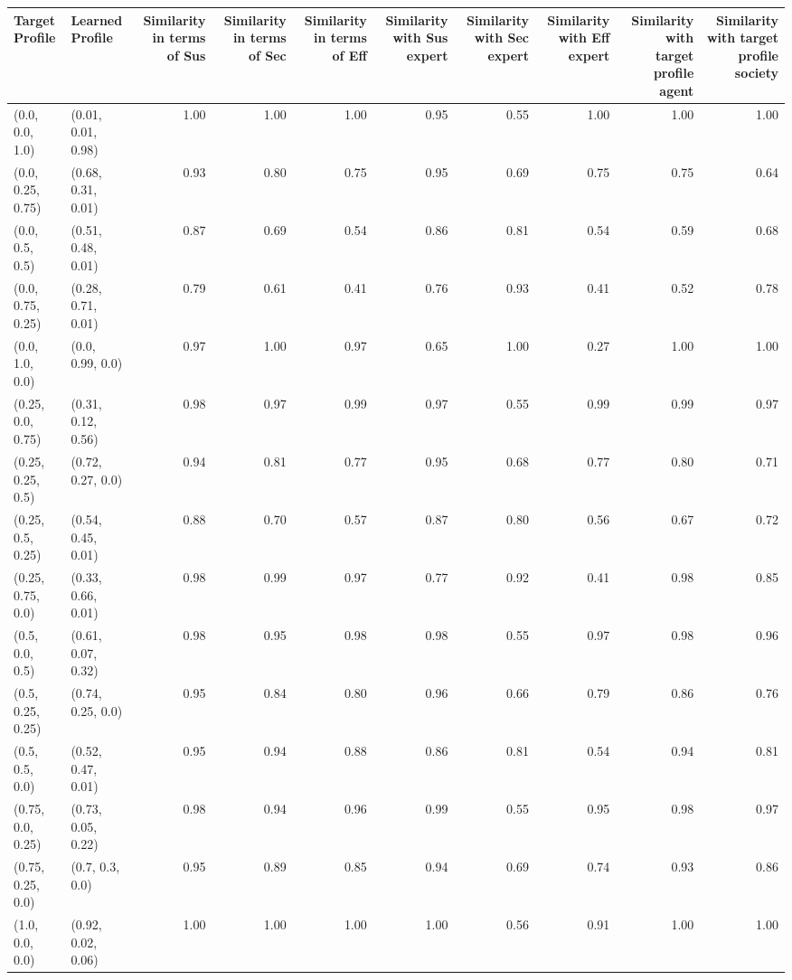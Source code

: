 \begin{tabular}{llrrrrrrrr}
\toprule
Target Profile & Learned Profile & Similarity in terms of Sus & Similarity in terms of Sec & Similarity in terms of Eff & Similarity with Sus expert & Similarity with Sec expert & Similarity with Eff expert & Similarity with target profile agent & Similarity with target profile society \\
\midrule
(0.0, 0.0, 1.0) & (0.01, 0.01, 0.98) & 1.00 & 1.00 & 1.00 & 0.95 & 0.55 & 1.00 & 1.00 & 1.00 \\
(0.0, 0.25, 0.75) & (0.68, 0.31, 0.01) & 0.93 & 0.80 & 0.75 & 0.95 & 0.69 & 0.75 & 0.75 & 0.64 \\
(0.0, 0.5, 0.5) & (0.51, 0.48, 0.01) & 0.87 & 0.69 & 0.54 & 0.86 & 0.81 & 0.54 & 0.59 & 0.68 \\
(0.0, 0.75, 0.25) & (0.28, 0.71, 0.01) & 0.79 & 0.61 & 0.41 & 0.76 & 0.93 & 0.41 & 0.52 & 0.78 \\
(0.0, 1.0, 0.0) & (0.0, 0.99, 0.0) & 0.97 & 1.00 & 0.97 & 0.65 & 1.00 & 0.27 & 1.00 & 1.00 \\
(0.25, 0.0, 0.75) & (0.31, 0.12, 0.56) & 0.98 & 0.97 & 0.99 & 0.97 & 0.55 & 0.99 & 0.99 & 0.97 \\
(0.25, 0.25, 0.5) & (0.72, 0.27, 0.0) & 0.94 & 0.81 & 0.77 & 0.95 & 0.68 & 0.77 & 0.80 & 0.71 \\
(0.25, 0.5, 0.25) & (0.54, 0.45, 0.01) & 0.88 & 0.70 & 0.57 & 0.87 & 0.80 & 0.56 & 0.67 & 0.72 \\
(0.25, 0.75, 0.0) & (0.33, 0.66, 0.01) & 0.98 & 0.99 & 0.97 & 0.77 & 0.92 & 0.41 & 0.98 & 0.85 \\
(0.5, 0.0, 0.5) & (0.61, 0.07, 0.32) & 0.98 & 0.95 & 0.98 & 0.98 & 0.55 & 0.97 & 0.98 & 0.96 \\
(0.5, 0.25, 0.25) & (0.74, 0.25, 0.0) & 0.95 & 0.84 & 0.80 & 0.96 & 0.66 & 0.79 & 0.86 & 0.76 \\
(0.5, 0.5, 0.0) & (0.52, 0.47, 0.01) & 0.95 & 0.94 & 0.88 & 0.86 & 0.81 & 0.54 & 0.94 & 0.81 \\
(0.75, 0.0, 0.25) & (0.73, 0.05, 0.22) & 0.98 & 0.94 & 0.96 & 0.99 & 0.55 & 0.95 & 0.98 & 0.97 \\
(0.75, 0.25, 0.0) & (0.7, 0.3, 0.0) & 0.95 & 0.89 & 0.85 & 0.94 & 0.69 & 0.74 & 0.93 & 0.86 \\
(1.0, 0.0, 0.0) & (0.92, 0.02, 0.06) & 1.00 & 1.00 & 1.00 & 1.00 & 0.56 & 0.91 & 1.00 & 1.00 \\
\bottomrule
\end{tabular}
